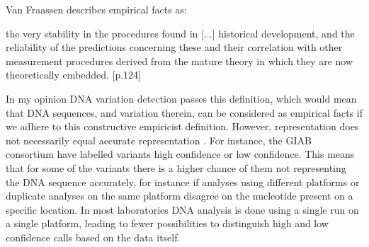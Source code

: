 Van Fraassen describes empirical facts as: \newline

\hfill\begin{minipage}{\dimexpr\textwidth-1cm}
the very stability in the procedures found in [...] historical development, and the reliability of the predictions concerning these and their correlation with other measurement procedures derived from the mature theory in which they are now theoretically embedded. [p.124]
\end{minipage} \newline \newline

\noindent In my opinion DNA variation detection passes this definition, which would mean that DNA sequences, and variation therein, can be considered as empirical facts if we adhere to this constructive empiricist definition. 
However, representation does not necessarily equal accurate representation \cite{Nguyen_2016}. 
For instance, the GIAB consortium have labelled variants high confidence or low confidence. 
This means that for some of the variants there is a higher chance of them not representing the DNA sequence accurately, for instance if analyses using different platforms or duplicate analyses on the same platform disagree on the nucleotide present on a specific location. 
In most laboratories DNA analysis is done using a single run on a single platform, leading to fewer possibilities to distinguish high and low confidence calls based on the data itself.



